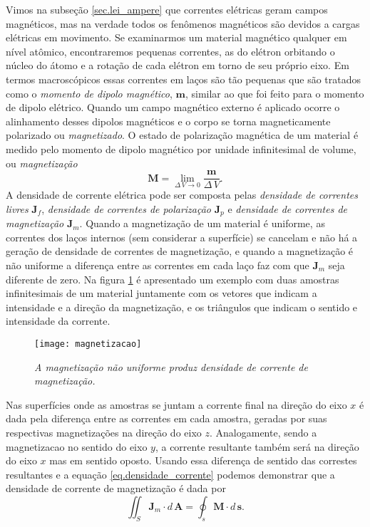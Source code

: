 Vimos na subseç\~ao \ref{sec.lei_ampere} que correntes el\'etricas geram campos magn\'eticos, mas na verdade todos os fen\^omenos magn\'eticos são devidos a cargas el\'etricas em movimento. Se examinarmos um material magn\'etico qualquer em n\'ivel at\^omico, encontraremos pequenas correntes, as do el\'etron orbitando o n\'ucleo do \'atomo e a rota\c{c}\~ao de cada el\'etron em torno de seu pr\'oprio eixo. Em termos macrosc\'opicos essas correntes em la\c{c}os s\~ao t\~ao pequenas que s\~ao tratados como o \textit{momento de dipolo magn\'etico}, $\mathbf{m}$, similar ao que foi feito para o momento de dipolo el\'etrico. Quando um campo magn\'etico externo \'e aplicado ocorre o alinhamento desses dipolos magn\'eticos e o corpo se torna magneticamente polarizado ou \textit{magnetizado}. O estado de polariza\c{c}\~ao magn\'etica de um material \'e medido pelo momento de dipolo magn\'etico por unidade infinitesimal de volume, ou \textit{magnetiza\c{c}\~ao}
\begin{equation*}
\mathbf{M}=\lim_{\Delta\,V\to 0}\frac{\mathbf{m}}{\Delta\,V}.
\end{equation*}   
A densidade de corrente el\'etrica pode ser composta pelas \textit{densidade de correntes livres} $\mathbf{J}_f$, \textit{densidade de correntes de polariza\c{c}\~ao} $\mathbf{J}_p$ e \textit{densidade de correntes de magnetiza\c{c}\~ao} $\mathbf{J}_m$. Quando a magnetiza\c{c}\~ao de um material \'e uniforme, as correntes dos la\c{c}os internos (sem considerar a superf\'icie) se cancelam e n\~ao h\'a a gera\c{c}\~ao de densidade de correntes de magnetiza\c{c}\~ao, e quando a magnetiza\c{c}\~ao \'e n\~ao uniforme a diferen\c{c}a entre as correntes em cada la\c{c}o faz com que $\mathbf{J}_m$ seja diferente de zero. Na figura \ref{fig.magnetizacao} \'e apresentado um exemplo com duas amostras infinitesimais de um material juntamente com os vetores que indicam a intensidade e a dire\c{c}\~ao da magnetiza\c{c}\~ao, e os tri\^angulos que indicam o sentido e intensidade da corrente.
\begin{figure}
\centering
\texttt{[image: magnetizacao]}
\caption{\textit{A magnetiza\c{c}\~ao n\~ao uniforme produz densidade de corrente de magnetiza\c{c}\~ao.}}
\label{fig.magnetizacao}
\end{figure}     
Nas superf\'icies onde as amostras se juntam a corrente final na dire\c{c}\~ao do eixo $x$ \'e dada pela diferen\c{c}a entre as correntes em cada amostra, geradas por suas respectivas magnetiza\c{c}\~oes na dire\c{c}\~ao do eixo $z$. Analogamente, sendo a magnetizacao no sentido do eixo $y$, a corrente resultante tamb\'em ser\'a na dire\c{c}\~ao do eixo $x$ mas em sentido oposto. Usando essa diferen\c{c}a de sentido das correstes resultantes e a equa\c{c}\~ao \ref{eq.densidade_corrente} podemos demonstrar que a densidade de corrente de magnetiza\c{c}\~ao \'e dada por
\begin{equation}\label{eq.magnetizacao_densi_corrente}
\iint_S\mathbf{J}_m\cdot d\,\mathbf{A}=\oint_s \mathbf{M}\cdot d\,\mathbf{s}.
\end{equation}


